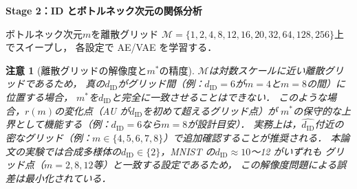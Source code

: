 \documentclass[12pt,a4paper]{jsarticle}
\newtheorem{remark}{注意}
\newcommand{\dID}{d_{\mathrm{ID}}}
\newcommand{\dz}{m}                         %
\newcommand{\dzopt}{m^*}                    %
\begin{document}
\textbf{Stage 2：ID とボトルネック次元の関係分析}

ボトルネック次元$\dz$を離散グリッド
$\mathcal{M} = \{1, 2, 4, 8, 12, 16, 20, 32, 64, 128, 256\}$上でスイープし，
各設定で AE/VAE を学習する．

\begin{remark}[離散グリッドの解像度と$\dzopt$の精度]\label{rem:grid_resolution}
$\mathcal{M}$は対数スケールに近い離散グリッドであるため，
真の$\dID$がグリッド間（例：$\dID = 6$が$m=4$と$m=8$の間）に位置する場合，
$\dzopt$を$\dID$と完全に一致させることはできない．
このような場合，$r(m)$の変化点（AU が$\dID$を初めて超えるグリッド点）が
$\dzopt$の保守的な上界として機能する（例：$\dID = 6$なら$m = 8$が設計目安）．
実務上は，$\hat{\dID}$付近の密なグリッド（例：$m \in \{4,5,6,7,8\}$）で追加確認することが推奨される．
本論文の実験では合成多様体の$\dID \in \{2\}$，MNIST の$\dID \approx 10$〜12 がいずれも
グリッド点（$m = 2, 8, 12$等）と一致する設定であるため，
この解像度問題による誤差は最小化されている．
\end{remark}
\end{document}
